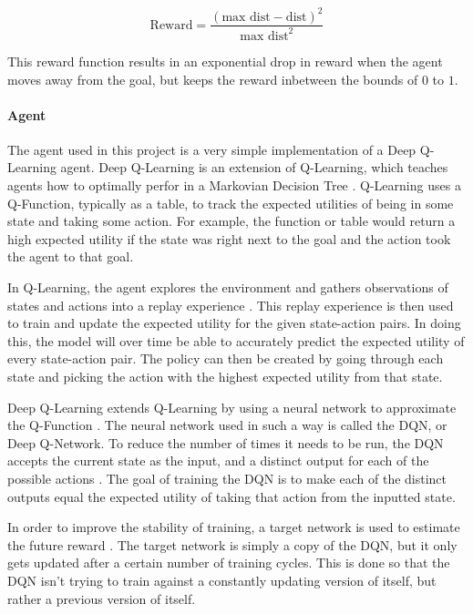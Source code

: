 \documentclass[12pt]{article}
\begin{document}
$$\text{Reward} = \frac{(\text{max dist} - \text{dist}) ^ 2}{\text{max dist}^2}$$

This reward function results in an exponential drop in reward when the agent moves away from the goal, but keeps the reward inbetween the bounds of $0$ to $1$.


\paragraph{Agent}
The agent used in this project is a very simple implementation of a Deep Q-Learning agent.
Deep Q-Learning is an extension of Q-Learning, which teaches agents how to optimally perfor in a Markovian Decision Tree \cite{article_q_learning}.
Q-Learning uses a Q-Function, typically as a table, to track the expected utilities of being in some state and taking some action.
For example, the function or table would return a high expected utility if the state was right next to the goal and the action took the agent to that goal.

In Q-Learning, the agent explores the environment and gathers observations of states and actions into a replay experience \cite{article_reinforcement_learning_for_robots}.
This replay experience is then used to train and update the expected utility for the given state-action pairs.
In doing this, the model will over time be able to accurately predict the expected utility of every state-action pair.
The policy can then be created by going through each state and picking the action with the highest expected utility from that state.

Deep Q-Learning extends Q-Learning by using a neural network to approximate the Q-Function \cite{article_human_level_control_deep_reinforcement_learning}.
The neural network used in such a way is called the DQN, or Deep Q-Network.
To reduce the number of times it needs to be run, the DQN accepts the current state as the input, and a distinct output for each of the possible actions \cite{article_reinforcement_learning_survey}.
The goal of training the DQN is to make each of the distinct outputs equal the expected utility of taking that action from the inputted state.

In order to improve the stability of training, a target network is used to estimate the future reward \cite{article_human_level_control_deep_reinforcement_learning}.
The target network is simply a copy of the DQN, but it only gets updated after a certain number of training cycles.
This is done so that the DQN isn't trying to train against a constantly updating version of itself, but rather a previous version of itself.
\end{document}
